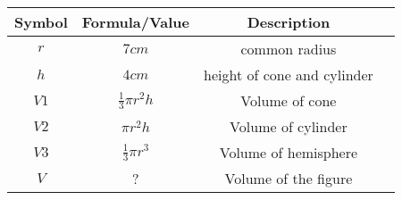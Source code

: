
\begin{tabular}{|c|c|c|c|}
\hline
 Symbol & Formula/Value & Description \\
\hline
 $r$  & $7cm$  & common radius  \\
 \hline
 $h$  & $4cm$  & height of cone and cylinder  \\
\hline
$V1$ & $\frac{1}{3} \pi r^2 h$ & Volume of cone\\
\hline
$V2$ & $\pi r^2 h$ & Volume of cylinder\\
\hline
$V3$ & $\frac{1}{3} \pi r^3$ & Volume of hemisphere\\
\hline
$V$ & ? & Volume of the figure\\
\hline
\end{tabular}